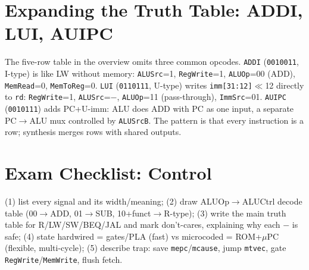 \begin{center}
\end{center}

\section{Expanding the Truth Table: ADDI, LUI, AUIPC}
The five-row table in the overview omits three common opcodes. \texttt{ADDI} (\texttt{0010011}, I-type) is like LW without memory: \texttt{ALUSrc}=1, \texttt{RegWrite}=1, \texttt{ALUOp}=00 (ADD), \texttt{MemRead}=0, \texttt{MemToReg}=0. \texttt{LUI} (\texttt{0110111}, U-type) writes \texttt{imm[31:12]}$\ll$12 directly to \texttt{rd}: \texttt{RegWrite}=1, \texttt{ALUSrc}=$-$, \texttt{ALUOp}=11 (pass-through), \texttt{ImmSrc}=01. \texttt{AUIPC} (\texttt{0010111}) adds PC+U-imm: ALU does ADD with PC as one input, a separate PC$\to$ALU mux controlled by \texttt{ALUSrcB}. The pattern is that every instruction is a row; synthesis merges rows with shared outputs.

\section{Exam Checklist: Control}
(1) list every signal and its width/meaning; (2) draw ALUOp$\to$ALUCtrl decode table (00$\to$ADD, 01$\to$SUB, 10+funct$\to$R-type); (3) write the main truth table for R/LW/SW/BEQ/JAL and mark don't-cares, explaining why each $-$ is safe; (4) state hardwired = gates/PLA (fast) vs microcoded = ROM+$\mu$PC (flexible, multi-cycle); (5) describe trap: save \texttt{mepc}/\texttt{mcause}, jump \texttt{mtvec}, gate \texttt{RegWrite}/\texttt{MemWrite}, flush fetch.


